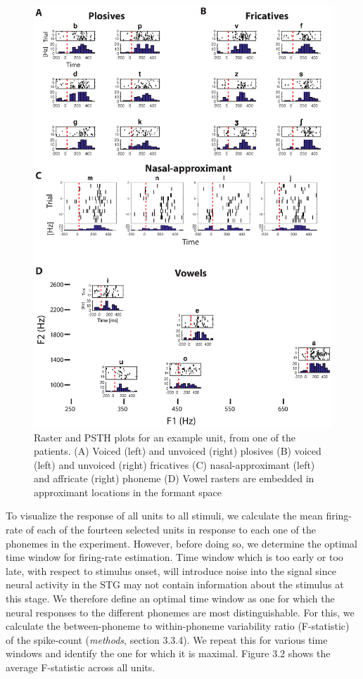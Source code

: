 \begin{figure}[H]
\vspace{.3in}
\includegraphics[width=\linewidth]{Figures/Ch3/Figure2_new.eps}
\caption{Raster and PSTH plots for an example unit, from one of the patients. (A) Voiced (left) and unvoiced (right) plosives (B) voiced (left) and unvoiced (right) fricatives (C)  nasal-approximant (left) and affricate (right) phoneme (D) Vowel rasters are embedded in approximant locations in the formant space}
\end{figure}

To visualize the response of all units to all stimuli, we calculate the mean firing-rate of each of the fourteen selected units in response to each one of the phonemes in the experiment. However, before doing so, we determine the optimal time window for firing-rate estimation. Time window which is too early or too late, with respect to stimulus onset, will introduce noise into the signal since neural activity in the STG may not contain information about the stimulus at this stage. We therefore define an optimal time window as one for which the neural responses to the different phonemes are most distinguishable. For this, we calculate the between-phoneme to within-phoneme variability ratio (F-statistic) of the spike-count (\textit{methods}, section 3.3.4). We repeat this for various time windows and identify the one for which it is maximal. Figure 3.2 shows the average F-statistic across all units.

